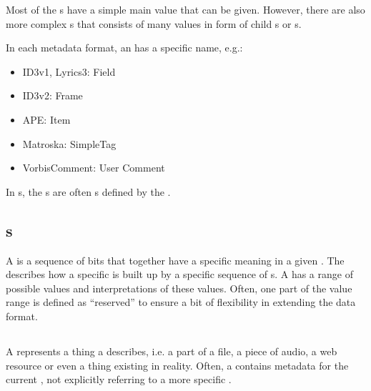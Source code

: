 Most of the \TERMattribute{}s have a simple main value that can be given. However, there are also more complex \TERMattribute{}s that consists of many values in form of child \TERMdataBlock{}s or \TERMfield{}s.

In each metadata format, an \TERMattribute{} has a specific name, e.g.:
\begin{itemize}
	\item ID3v1, Lyrics3: Field
	\item ID3v2: Frame
	\item APE: Item
	\item Matroska: SimpleTag
	\item VorbisComment: User Comment
\end{itemize}

In \TERMcontainerFormat{}s, the \TERMattribute{}s are often \TERMcontainer{}s defined by the \TERMcontainerFormat{}.


\subsection{\TERMfield{}s}
\label{sec:Fields}

A \TERMfield{} is a sequence of bits that together have a specific meaning in a given \TERMdataFormat{}. The \TERMdataFormat{} describes how a specific \TERMdataBlock{} is built up by a specific sequence of \TERMfield{}s. A \TERMfield{} has a range of possible values and
interpretations of these values. Often, one part of the value range is defined as ``reserved'' to ensure a bit of flexibility in extending the data format.


\subsection{\TERMsubject{}}
\label{sec:Subject}

A \TERMsubject{} represents a thing a \TERMtag{} describes, i.e. a part of a file, a piece of audio, a web resource or even a thing existing in reality. Often, a \TERMtag{} contains metadata for the current \TERMmedium{}, not explicitly referring to a more specific \TERMsubject{}.


